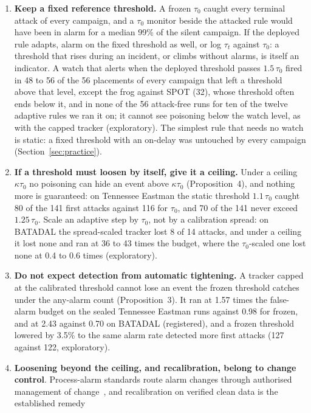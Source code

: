 \documentclass[sigconf,review,anonymous]{acmart}
\begin{document}
\begin{enumerate}
\item \textbf{Keep a fixed reference threshold.} A frozen $\tau_0$ caught every terminal attack of
  every campaign, and a $\tau_0$ monitor beside the attacked rule would have been in alarm for a median
  99\% of the silent campaign. If the deployed rule adapts, alarm on the fixed threshold as well, or log
  $\tau_t$ against $\tau_0$: a threshold that rises during an incident, or climbs without alarms, is
  itself an indicator. A watch that alerts when the deployed threshold passes $1.5\,\tau_0$ fired in 48
  to 56 of the 56 placements of every campaign that left a threshold above that level, except the frog
  against SPOT (32), whose threshold often ends below it, and in none of the 56 attack-free runs
  for ten of the twelve adaptive rules we ran it on; it cannot see poisoning below the watch level,
  as with the capped tracker (exploratory). The simplest rule that needs no watch is static: a fixed
  threshold with an on-delay was untouched by every campaign (Section~\ref{sec:practice}).
\item \textbf{If a threshold must loosen by itself, give it a ceiling.} Under a ceiling
  $\kappa\tau_0$ no poisoning can hide an event above $\kappa\tau_0$ (Proposition~4), and nothing more
  is guaranteed: on Tennessee Eastman the static threshold $1.1\,\tau_0$ caught 80 of the 141 first
  attacks against 116 for $\tau_0$, and 70 of the 141 never exceed $1.25\,\tau_0$. Scale an adaptive
  step by $\tau_0$, not by a calibration spread: on BATADAL the spread-scaled tracker lost 8 of 14
  attacks, and under a ceiling it lost none and ran at 36 to 43 times the budget, where the
  $\tau_0$-scaled one lost none at 0.4 to 0.6 times (exploratory).
\item \textbf{Do not expect detection from automatic tightening.} A tracker capped at the calibrated
  threshold cannot lose an event the frozen threshold catches under the any-alarm count
  (Proposition~3). It ran at 1.57 times the false-alarm budget on the sealed Tennessee Eastman runs
  against 0.98 for frozen, and at 2.43 against 0.70 on BATADAL (registered), and a frozen threshold
  lowered by 3.5\% to the same alarm rate detected more first attacks (127 against 122, exploratory).
\item \textbf{Loosening beyond the ceiling, and recalibration, belong to change control}. Process-alarm standards route alarm changes through authorised management of
  change~\cite{isa182, eemua191}, and recalibration on verified clean data is the established remedy

\end{enumerate}
\end{document}
